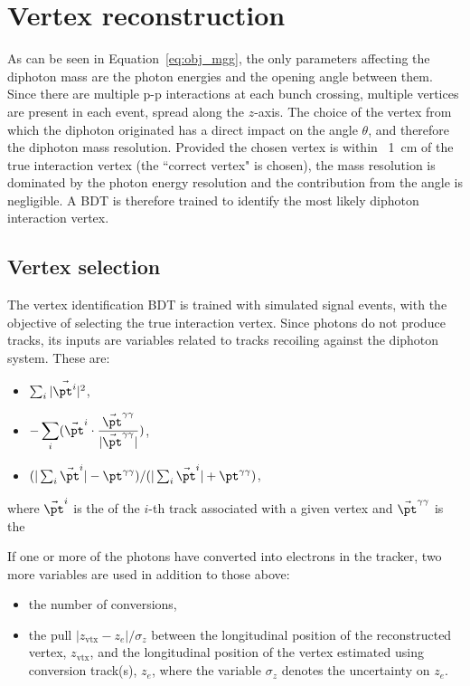 \section{Vertex reconstruction}

As can be seen in Equation~\ref{eq:obj_mgg}, 
the only parameters affecting the diphoton mass are the photon energies and the opening angle between them.
Since there are multiple p-p interactions at each bunch crossing, multiple vertices are present in each event, spread along the $z$-axis.
The choice of the vertex from which the diphoton originated has a direct impact on the angle $\theta$, 
and therefore the diphoton mass resolution.
Provided the chosen vertex is within ~\SI{1}{cm} of the true interaction vertex (the ``correct vertex" is chosen), 
the mass resolution is dominated by the photon energy resolution and the contribution from the angle is negligible.
A BDT is therefore trained to identify the most likely diphoton interaction vertex.

\subsection{Vertex selection}

The vertex identification BDT is trained with simulated \Hgg signal events, 
with the objective of selecting the true interaction vertex.
Since photons do not produce tracks, its inputs  are variables related to tracks
recoiling against the diphoton system. 
These are:
\begin{itemize}
        \item $\sum_{i}|\vec{\pt^{i}}|^{2}$,
        \item $\displaystyle -\sum_{i}(\vec{\pt}^{i}\cdot \frac{\vec{\pt}^{\gamma\gamma}}{|\vec{\pt}^{\gamma\gamma}|})$,
        \item $(|\sum_{i}\vec{\pt}^{i}| - \pt^{\gamma\gamma})/(|\sum_{i}\vec{\pt}^{i}| + \pt^{\gamma\gamma})$,
\end{itemize}
where $\vec{\pt}^{i}$ is the \pt of the $i$-th track
associated with a given vertex and $\vec{\pt}^{\gamma\gamma}$ is the

If one or more of the photons have converted into electrons in the tracker, 
two more variables are used in addition to those above:
\begin{itemize}
        \item the number of conversions,
        \item the pull $|z_{\text{vtx}} - z_e| /\sigma_{z}$ between the
                longitudinal position of the reconstructed vertex,
                $z_{\text{vtx}}$, and the longitudinal position of the
                vertex estimated using conversion track(s), $z_e$,
                where the variable $\sigma_{z}$ denotes the uncertainty 
                on $z_e$.
\end{itemize}

